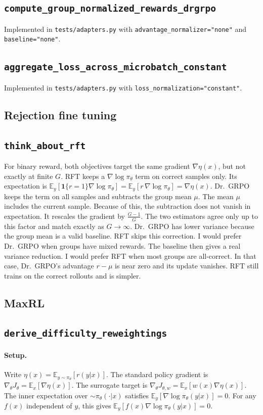 \documentclass[11pt]{article}
\newcommand{\E}{\mathbb{E}}
\newcommand{\policy}{\pi_\theta}
\newcommand{\problemid}[1]{\subsection*{\nolinkurl{#1}}}
\begin{document}
\problemid{compute_group_normalized_rewards_drgrpo}
Implemented in \texttt{tests/adapters.py} with \texttt{advantage\_normalizer="none"} and \texttt{baseline="none"}.

\problemid{aggregate_loss_across_microbatch_constant}
Implemented in \texttt{tests/adapters.py} with \texttt{loss\_normalization="constant"}.

\subsection{Rejection fine tuning}

\problemid{think_about_rft}

For binary reward, both objectives target the same gradient $\nabla\eta(x)$,
but not exactly at finite $G$. RFT keeps a $\nabla\log\policy$ term on correct
samples only. Its expectation is
$\E_y[\mathbf{1}\{r=1\}\nabla\log\policy] = \E_y[r\,\nabla\log\policy] =
\nabla\eta(x)$. Dr.\ GRPO keeps the term on all samples and subtracts the
group mean $\mu$. The mean $\mu$ includes the current sample. Because of this,
the subtraction does not vanish in expectation. It rescales the gradient by
$\tfrac{G-1}{G}$. The two estimators agree only up to this factor and match
exactly as $G\to\infty$. Dr.\ GRPO has lower variance because the group mean
is a valid baseline. RFT skips this correction. I would prefer Dr.\ GRPO when
groups have mixed rewards. The baseline then gives a real variance reduction.
I would prefer RFT when most groups are all-correct. In that case, Dr.\ GRPO's
advantage $r-\mu$ is near zero and its update vanishes. RFT still trains on
the correct rollouts and is simpler.

\subsection{MaxRL}

\problemid{derive_difficulty_reweightings}

\paragraph{Setup.} Write $\eta(x) = \E_{y\sim\policy}[r(y|x)]$. The standard
policy gradient is $\nabla_\theta J_\theta = \E_x[\nabla\eta(x)]$. The surrogate
target is $\nabla_\theta J_{\theta,w} = \E_x[w(x)\nabla\eta(x)]$. The inner
expectation over $\sim\policy(\cdot|x)$ satisfies
$\E_y[\nabla\log\policy(y|x)] = 0$. For any $f(x)$ independent of $y$, this
gives $\E_y[f(x)\nabla\log\policy(y|x)] = 0$.
\end{document}

